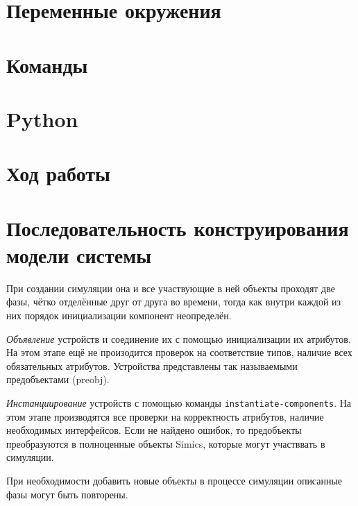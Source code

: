 \section{Переменные окружения}

\section{Команды}

\section{Python}

\section{Ход работы}

\todo 


\section{Последовательность конструирования модели системы}

При создании симуляции она и все участвующие в ней объекты проходят две фазы, чётко отделённые друг от друга во времени, тогда как внутри каждой из них порядок инициализации компонент неопределён.

\begin{enumerate*}

\item \textit{Объявление} устройств и соединение их с помощью инициализации их атрибутов. На этом этапе ещё не произодится проверок на соответствие типов, наличие всех обязательных атрибутов. Устройства представлены так называемыми предобъектами (\abbr preobj).

\item \textit{Инстанциирование} устройств с помощью команды \texttt{instantiate-components}. На этом этапе производятся все проверки на корректность атрибутов, наличие необходимых интерфейсов. Если не найдено ошибок, то предобъекты преобразуются в полноценные объекты Simics, которые могут участввать в симуляции.

\end{enumerate*}

При необходимости добавить новые объекты в процессе симуляции описанные фазы могут быть повторены.



